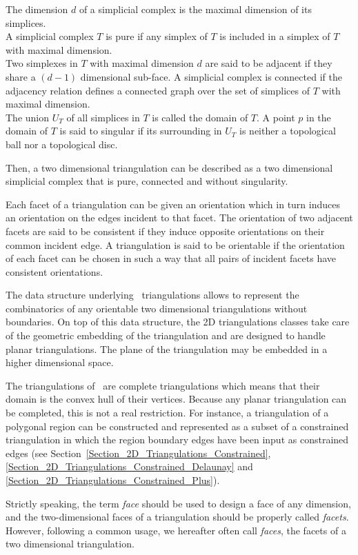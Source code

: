 The dimension $d$ of a  simplicial complex is the 
maximal dimension of its simplices. \\
A simplicial complex $T$ is pure if any simplex of $T$
is included in a simplex of $T$ with maximal dimension. \\
Two simplexes in $T$ with maximal dimension $d$ are said to be
adjacent if they share a $(d-1)$ dimensional sub-face.
A simplicial complex is connected if the adjacency relation
defines a connected graph 
over  the set of simplices of $T$ with maximal dimension. \\
The union $U_T$ of all simplices in $T$ is called the domain of $T$.
A point $p$ in the domain of $T$ is said to singular 
if its surrounding in $U_T$
is neither a topological ball nor a topological disc.

Then, a two dimensional triangulation can be described as a 
two dimensional simplicial complex  that is pure,
connected and without singularity.

Each facet of a triangulation can be given an orientation
which in turn induces an orientation
on the edges incident to that facet. The orientation of two adjacent
facets are said to be consistent if they induce
opposite orientations on their common incident edge.
A triangulation is said to be orientable if 
the orientation of each facet can be chosen in such a way
that all pairs of incident facets have consistent orientations. 

The data structure underlying \cgal\ triangulations
allows to represent the combinatorics of 
any  orientable two dimensional  triangulations
without boundaries. 
On top of this data structure, the 2D triangulations classes
take care of the geometric embedding  of the triangulation
and are designed to handle planar triangulations.
The plane of the triangulation may be embedded in a higher
dimensional space.

The  triangulations of  \cgal\ are complete triangulations
which means  that their domain is  the
convex hull of  their vertices.
Because any planar triangulation
can be completed, this is not a real restriction.
For instance, a triangulation of a  polygonal region can be
constructed  and represented as a subset  of a constrained triangulation 
in which  the region boundary edges have been input as 
constrained edges (see
Section~\ref{Section_2D_Triangulations_Constrained},
\ref{Section_2D_Triangulations_Constrained_Delaunay} and 
\ref{Section_2D_Triangulations_Constrained_Plus}).

Strictly speaking, the term {\em face} should be used
to design  a face of any dimension,
and the two-dimensional faces of a triangulation 
should be properly called {\em facets}.
However, following a common usage, we hereafter often call {\em
faces}, the facets
of a two dimensional triangulation.

